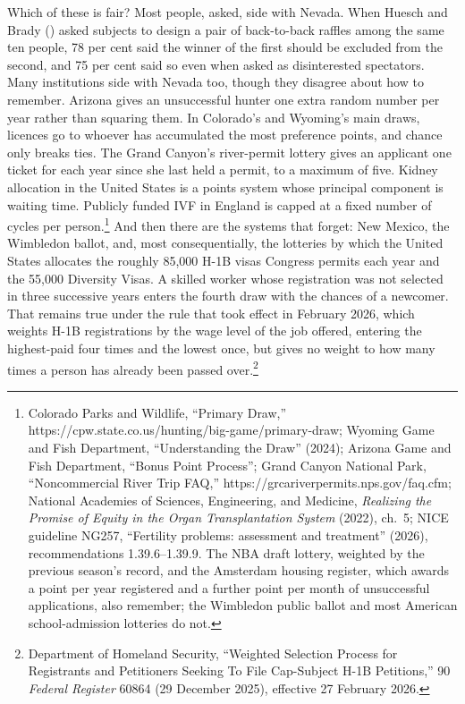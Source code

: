 \documentclass[
  11pt,
  letterpaper,
  DIV=11,
  numbers=noendperiod,
  twoside]{scrartcl}
\begin{document}
Which of these is fair? Most people, asked, side with Nevada. When
Huesch and Brady () asked subjects
to design a pair of back-to-back raffles among the same ten people, 78
per cent said the winner of the first should be excluded from the
second, and 75 per cent said so even when asked as disinterested
spectators. Many institutions side with Nevada too, though they disagree
about how to remember. Arizona gives an unsuccessful hunter one extra
random number per year rather than squaring them. In Colorado's and
Wyoming's main draws, licences go to whoever has accumulated the most
preference points, and chance only breaks ties. The Grand Canyon's
river-permit lottery gives an applicant one ticket for each year since
she last held a permit, to a maximum of five. Kidney allocation in the
United States is a points system whose principal component is waiting
time. Publicly funded IVF in England is capped at a fixed number of
cycles per person.\footnote{Colorado Parks and Wildlife, ``Primary
  Draw,'' https://cpw.state.co.us/hunting/big-game/primary-draw; Wyoming
  Game and Fish Department, ``Understanding the Draw'' (2024); Arizona
  Game and Fish Department, ``Bonus Point Process''; Grand Canyon
  National Park, ``Noncommercial River Trip FAQ,''
  https://grcariverpermits.nps.gov/faq.cfm; National Academies of
  Sciences, Engineering, and Medicine, \emph{Realizing the Promise of
  Equity in the Organ Transplantation System} (2022), ch.~5; NICE
  guideline NG257, ``Fertility problems: assessment and treatment''
  (2026), recommendations 1.39.6--1.39.9. The NBA draft lottery,
  weighted by the previous season's record, and the Amsterdam housing
  register, which awards a point per year registered and a further point
  per month of unsuccessful applications, also remember; the Wimbledon
  public ballot and most American school-admission lotteries do not.}
And then there are the systems that forget: New Mexico, the Wimbledon
ballot, and, most consequentially, the lotteries by which the United
States allocates the roughly 85,000 H-1B visas Congress permits each
year and the 55,000 Diversity Visas. A skilled worker whose registration
was not selected in three successive years enters the fourth draw with
the chances of a newcomer. That remains true under the rule that took
effect in February 2026, which weights H-1B registrations by the wage
level of the job offered, entering the highest-paid four times and the
lowest once, but gives no weight to how many times a person has already
been passed over.\footnote{Department of Homeland Security, ``Weighted
  Selection Process for Registrants and Petitioners Seeking To File
  Cap-Subject H-1B Petitions,'' 90 \emph{Federal Register} 60864 (29
  December 2025), effective 27 February 2026.}
\end{document}
